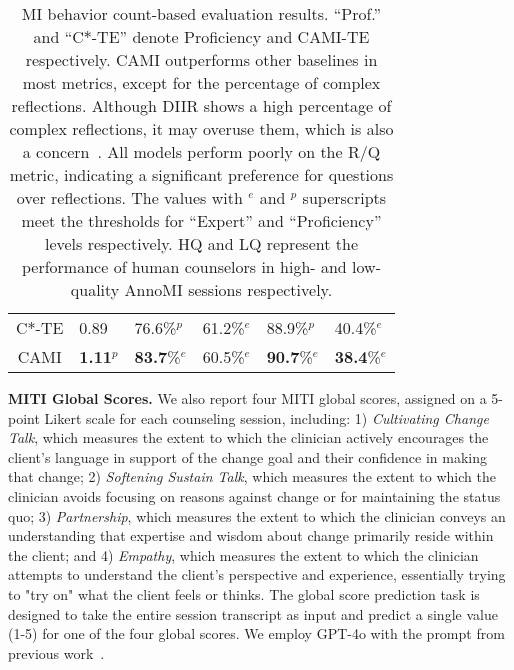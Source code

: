 \begin{table}[tb]
{\begin{tabular}{clllll}
C$\ast$-TE  & 0.89             & 76.6\%$^p$           & 61.2\%$^e$            & 88.9\%$^p$            & 40.4\%$^e$         \\
CAMI                  & \textbf{1.11}$^p$  & \textbf{83.7}\%$^e$   & 60.5\%$^e$            & \textbf{90.7}\%$^e$  & \textbf{38.4}\%$^e$         \\ \bottomrule
\end{tabular}}
\caption{MI behavior count-based evaluation results. ``Prof.'' and ``C$\ast$-TE'' denote Proficiency and CAMI-TE respectively.  CAMI outperforms other baselines in most metrics, except for the percentage of complex reflections. Although DIIR shows a high percentage of complex reflections, it may overuse them, which is also a concern~\citep{steenstra2024virtual}. All models perform poorly on the R/Q metric, indicating a significant preference for questions over reflections. The values with $^e$ and $^p$ superscripts meet the thresholds for ``Expert'' and ``Proficiency'' levels respectively. HQ and LQ represent the performance of human counselors in high- and low-quality AnnoMI sessions respectively.}
\label{tab:miti}
\end{table}

\noindent
\textbf{MITI Global Scores.} We also report four MITI global scores, assigned on a 5-point Likert scale for each counseling session, including: 1) \emph{Cultivating Change Talk}, which measures the extent to which the clinician actively encourages the client’s language in support of the change goal and their confidence in making that change; 2) \emph{Softening Sustain Talk}, which measures the extent to which the clinician avoids focusing on reasons against change or for maintaining the status quo; 3) \emph{Partnership}, which measures the extent to which the clinician conveys an understanding that expertise and wisdom about change primarily reside within the client; and 4) \emph{Empathy}, which measures the extent to which the clinician attempts to understand the client’s perspective and experience, essentially trying to "try on" what the client feels or thinks. The global score prediction task is designed to take the entire session transcript as input and predict a single value (1-5) for one of the four global scores. We employ GPT-4o with the prompt from previous work~\citep{cohen2024motivational}.

